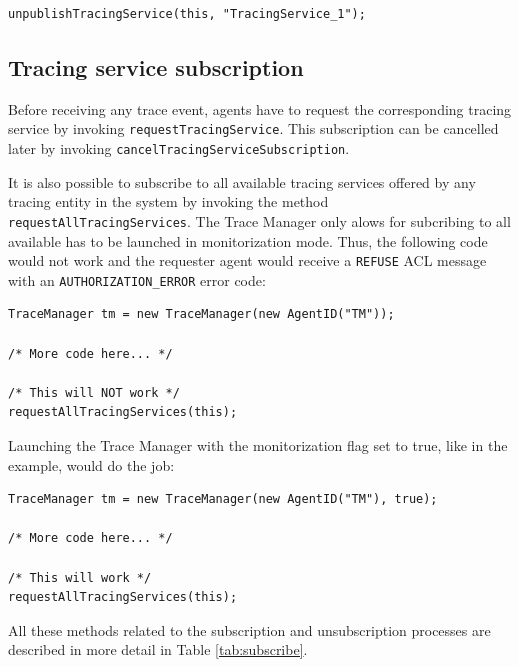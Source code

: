 		\begin{lstlisting}
unpublishTracingService(this, "TracingService_1");
		\end{lstlisting}

		\subsection{Tracing service subscription}\label{sec:subscription}

			Before receiving any trace event, agents have to request the corresponding tracing service
			by invoking \lstinline{requestTracingService}. This subscription can be cancelled later by
			invoking \lstinline{cancelTracingServiceSubscription}.

			It is also possible to subscribe to all available tracing services offered by any tracing entity in
			the system by invoking the method \lstinline{requestAllTracingServices}. The Trace Manager
			only alows for subcribing to all available has to be launched in monitorization mode. Thus,
			the following code would not work and the requester agent would receive a \texttt{REFUSE}
			ACL message with an \texttt{AUTHORIZATION\_ERROR} error code:

			\begin{lstlisting}
TraceManager tm = new TraceManager(new AgentID("TM"));

/* More code here... */

/* This will NOT work */
requestAllTracingServices(this);
			\end{lstlisting}

			Launching the Trace Manager with the monitorization flag set to true, like in the example,
			would do the job:

			\begin{lstlisting}
TraceManager tm = new TraceManager(new AgentID("TM"), true);

/* More code here... */

/* This will work */
requestAllTracingServices(this);
			\end{lstlisting}

			All these methods related to the subscription and unsubscription processes are described in
			more detail in Table \ref{tab:subscribe}.

